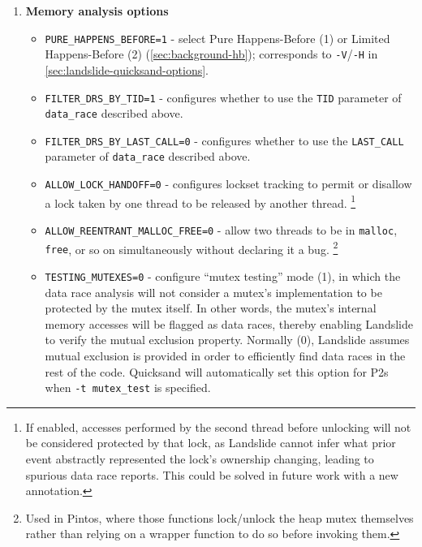 \begin{enumerate}
\item {\bf Memory analysis options}
\begin{itemize}
	\item {\tt PURE\_HAPPENS\_BEFORE=1} - select Pure Happens-Before (1) or Limited Happens-Before (2) (\cref{sec:background-hb});
		corresponds to {\tt -V}/{\tt -H} in \cref{sec:landslide-quicksand-options}.
	\item {\tt FILTER\_DRS\_BY\_TID=1} - configures whether to use the {\tt TID} parameter of {\tt data\_\allowbreak{}race} described above.
	\item {\tt FILTER\_DRS\_BY\_LAST\_CALL=0} - configures whether to use the {\tt LAST\_CALL} parameter of {\tt data\_race} described above.
	\item {\tt ALLOW\_LOCK\_HANDOFF=0} - configures lockset tracking to permit or disallow a lock taken by one thread to be released by another thread.%
		\footnote{If enabled, accesses performed by the second thread before unlocking will not be considered protected by that lock,
			as Landslide cannot infer what prior event abstractly represented the lock's ownership changing,
			leading to spurious data race reports.
			This could be solved in future work with a new annotation.}
	\item {\tt ALLOW\_REENTRANT\_MALLOC\_FREE=0} - allow two threads to be in {\tt malloc}, {\tt free}, or so on simultaneously without declaring it a bug.%
		\footnote{Used in Pintos, where those functions lock/unlock the heap mutex themselves rather than relying on a wrapper function to do so before invoking them.}
	\item {\tt TESTING\_MUTEXES=0} - configure ``mutex testing'' mode (1),
		in which the data race analysis will not consider a mutex's implementation to be protected by the mutex itself.
		In other words, the mutex's internal memory accesses will be flagged as data races,
		thereby enabling Landslide to verify the mutual exclusion property.
		Normally (0), Landslide assumes mutual exclusion is provided in order to efficiently find data races in the rest of the code.
		Quicksand will automatically set this option for P2s when {\tt -t mutex\_test} is specified.
\end{itemize}


\end{enumerate}
